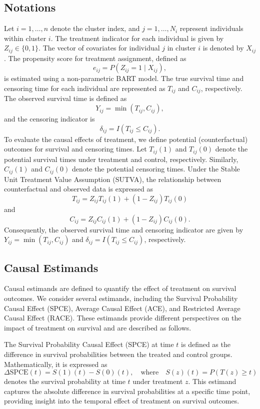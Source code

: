 \documentclass[useAMS,referee]{biom}
\begin{document}
\subsection{Notations}
Let \( i = 1, \ldots, n \) denote the cluster index, and \( j = 1, \ldots, N_i \) represent individuals within cluster \( i \). The treatment indicator for each individual is given by \( Z_{ij} \in \{0, 1\} \). The vector of covariates for individual \( j \) in cluster \( i \) is denoted by \( X_{ij} \). The propensity score for treatment assignment, defined as 
\[
e_{ij} = P(Z_{ij} = 1 \mid X_{ij}),
\]
is estimated using a non-parametric BART model. The true survival time and censoring time for each individual are represented as \( T_{ij} \) and \( C_{ij} \), respectively. The observed survival time is defined as 
\[
Y_{ij} = \min(T_{ij}, C_{ij}),
\]
and the censoring indicator is 
\[
\delta_{ij} = I(T_{ij} \leq C_{ij}).
\]
To evaluate the causal effects of treatment, we define potential (counterfactual) outcomes for survival and censoring times. Let \( T_{ij}(1) \) and \( T_{ij}(0) \) denote the potential survival times under treatment and control, respectively. Similarly, \( C_{ij}(1) \) and \( C_{ij}(0) \) denote the potential censoring times. Under the Stable Unit Treatment Value Assumption (SUTVA), the relationship between counterfactual and observed data is expressed as 
\[
T_{ij} = Z_{ij} T_{ij}(1) + (1 - Z_{ij}) T_{ij}(0)
\]
and 
\[
C_{ij} = Z_{ij} C_{ij}(1) + (1 - Z_{ij}) C_{ij}(0).
\]
Consequently, the observed survival time and censoring indicator are given by \( Y_{ij} = \min(T_{ij}, C_{ij}) \) and \( \delta_{ij} = I(T_{ij} \leq C_{ij}) \), respectively.

\subsection{Causal Estimands}
Causal estimands are defined to quantify the effect of treatment on survival outcomes. We consider several estimands, including the Survival Probability Causal Effect (SPCE), Average Causal Effect (ACE), and Restricted Average Causal Effect (RACE). These estimands provide different perspectives on the impact of treatment on survival and are described as follows.

The Survival Probability Causal Effect (SPCE) at time \( t \) is defined as the difference in survival probabilities between the treated and control groups. Mathematically, it is expressed as 
\[
\Delta \text{SPCE}(t) = S(1)(t) - S(0)(t), \quad \text{where} \quad S(z)(t) = P(T(z) \geq t)
\]
denotes the survival probability at time \( t \) under treatment \( z \). This estimand captures the absolute difference in survival probabilities at a specific time point, providing insight into the temporal effect of treatment on survival outcomes.
\end{document}
